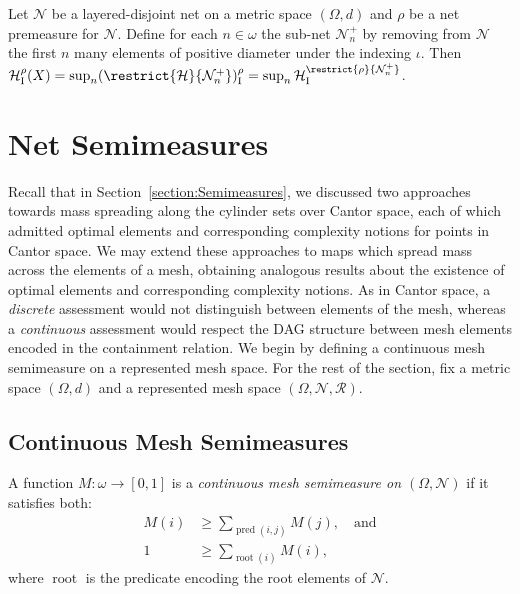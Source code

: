 \begin{theorem}
    \label{theorem:stability_for_net_measures}
    Let $\mathcal{N}$ be a layered-disjoint net on a metric space $(\Omega, d)$ and $\rho$ be a net premeasure for $\mathcal{N}$. Define for each $n \in \omega$ the sub-net $\mathcal{N}^+_n$ by removing from $\mathcal{N}$ the first $n$ many elements of positive diameter under the indexing $\iota$. Then $\mathcal{H}^\rho_{\operatorname{I}}(X) = \sup_n (\restrict{\mathcal{H}}{\mathcal{N}^+_n})^{\rho}_{\operatorname{I}} = \sup_n \mathcal{H}^{\restrict{\rho}{{\mathcal{N}^+_n}}}_{\operatorname{I}}$. 
\end{theorem}

\section{Net Semimeasures}
\label{section:Net_Semimeasures}

Recall that in Section~\ref{section:Semimeasures}, we discussed two approaches towards mass spreading along the cylinder sets over Cantor space, each of which admitted optimal elements and corresponding complexity notions for points in Cantor space. We may extend these approaches to maps which spread mass across the elements of a mesh, obtaining analogous results about the existence of optimal elements and corresponding complexity notions. As in Cantor space, a \textit{discrete} assessment would not distinguish between elements of the mesh, whereas a \textit{continuous} assessment would respect the DAG structure between mesh elements encoded in the containment relation. We begin by defining a continuous mesh semimeasure on a represented mesh space. For the rest of the section, fix a metric space $(\Omega, d)$ and a represented mesh space $(\Omega, \mathcal{N}, \mathscr{R})$.

\subsection{Continuous Mesh Semimeasures}

\begin{definition}
    A function $M: \omega \to [0, 1]$ is a \textit{continuous mesh semimeasure on $(\Omega, \mathcal{N})$} if it satisfies both: 
    \begin{align}
        M(i) &\geq \sum_{\operatorname{pred}(i, j)} M(j), \quad \text{and}
        \label{eqn:continuous_mesh_semimeasure_condition}\\
        1 &\geq \sum_{\operatorname{root}(i)} M(i),
        \label{eqn:boundedness_continuous_mesh_semimeasure_condition}
    \end{align}
    where $\operatorname{root}$ is the predicate encoding the root elements of $\mathcal{N}$.
\end{definition}

